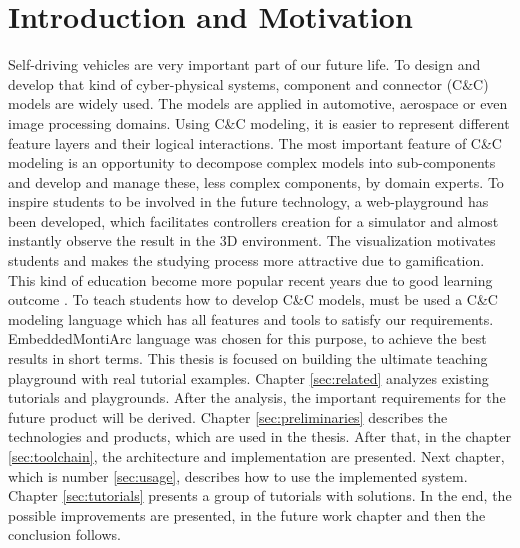 \setlength{\parindent}{3ex}
\setlength{\parskip}{0ex}

\chapter{Introduction and Motivation}
Self-driving vehicles are very important part of our future life. To design and develop that kind of cyber-physical systems, component and connector (C\&C) models are widely used. The models are applied in automotive, aerospace or even image processing domains. Using C\&C modeling, it is easier to represent different feature layers and their logical interactions. The most important feature of C\&C modeling is an opportunity to decompose complex models into sub-components and develop and manage these, less complex components, by domain experts.\newline
To inspire students to be involved in the future technology, a web-playground has been developed, which facilitates controllers creation for a simulator and almost instantly observe the result in the 3D environment. The visualization motivates students and makes the studying process more attractive due to gamification. This kind of education become more popular recent years due to good learning outcome \cite{Game}.\newline
To teach students how to develop C\&C models, must be used a C\&C modeling language which has all features and tools to satisfy our requirements. EmbeddedMontiArc \cite{HR17} language was chosen for this purpose, to achieve the best results in short terms.\newline
This thesis is focused on building the ultimate teaching playground with real tutorial examples. Chapter \ref{sec:related} analyzes existing tutorials and playgrounds. After the analysis, the important requirements for the future product will be derived. Chapter \ref{sec:preliminaries} describes the technologies and products, which are used in the thesis. After that, in the chapter \ref{sec:toolchain}, the architecture and implementation are presented. Next chapter, which is number \ref{sec:usage}, describes how to use the implemented system. Chapter \ref{sec:tutorials} presents a group of tutorials with solutions. In the end, the possible improvements are presented, in the future work chapter and then the conclusion follows.
\cleardoublepage

